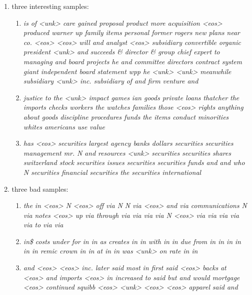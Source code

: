 \begin{enumerate}
\begin{enumerate}
\begin{enumerate}
		
	\end{enumerate}	

	\item three interesting samples:
	\begin{enumerate}
		\item
		\textit{
		is of <unk> care gained proposal product more acquisition <eos> produced warner up family items personal former rogers new plans near co. <eos> <eos> will and analyst <eos> subsidiary convertible organic president <unk> and succeeds \& director \& group chief expert to managing and board projects he and committee directors contract system giant independent board statement wpp he <unk> <unk> meanwhile subsidiary <unk> inc. subsidiary of and firm venture and	}
		
		\item 
		\textit{
		justice to the <unk> impact games ian goods private loans thatcher the imports checks workers the watches families those <eos> rights anything about goods discipline procedures funds the items conduct minorities whites americans use value}
		
		\item 
		\textit{
		has <eos> securities largest agency banks dollars securities securities management mr. N and resources <unk> securities securities shares switzerland stock securities issues securities securities funds and and who N securities financial securities the securities international}
			
	\end{enumerate}

	\item three bad samples:
	\begin{enumerate}
		\item 
		\textit{
		the in <eos> N <eos> off via N N via <eos> and via communications N via notes <eos> up via through via via via via N <eos> via via via via via to via via}
		
		\item 
		\textit{
		in\$ costs under for in in as creates in in with in in due from in in in in in in remic crown in in at in in was <unk> on rate in in}
		
		\item
		\textit{ 
		and <eos> <eos> inc. later said most in first said <eos> backs at <eos> and imports <eos> in increased to said but and would mortgage <eos> continued squibb <eos> <unk> <eos> <eos> apparel said and}
		
	\end{enumerate}


\end{enumerate}
\end{enumerate}
